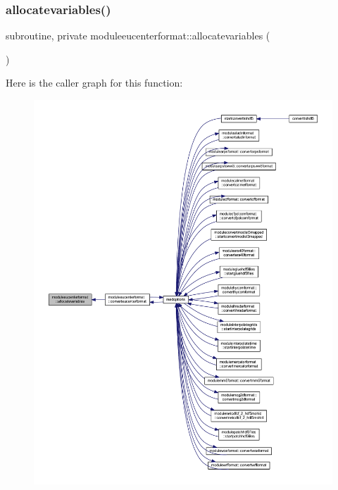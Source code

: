 \subsubsection{\texorpdfstring{allocatevariables()}{allocatevariables()}}
{\footnotesize\ttfamily subroutine, private moduleeucenterformat\+::allocatevariables (\begin{DoxyParamCaption}{ }\end{DoxyParamCaption})\hspace{0.3cm}{\ttfamily [private]}}

Here is the caller graph for this function\+:\nopagebreak
\begin{figure}[H]
\begin{center}
\leavevmode
\includegraphics[width=350pt]{namespacemoduleeucenterformat_a363ea37d06e552dd3191189238b401fc_icgraph}
\end{center}
\end{figure}
\mbox{\label{namespacemoduleeucenterformat_a95230a7fb149b9fbacb2fdd6d4bc776d}} 
